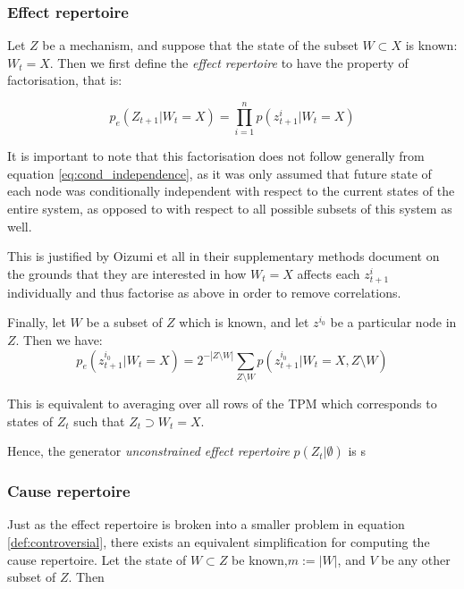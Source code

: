 \subsubsection{Effect repertoire}

Let $Z$ be a mechanism, and suppose that the state of the subset $W \subset X$ is known: $W_t = X$. Then we first define the \textit{effect repertoire} to have the property of factorisation, that is:

\begin{equation}
\label{def:controversial}
p_e(Z_{t+1}|W_t = X) = \prod \limits_{i= 1}^n p(z^i_{t+1}|W_t = X)
\end{equation}

It is important to note that this factorisation does not follow generally from equation \ref{eq:cond_independence}, as it was only assumed that future state of each node was conditionally independent with respect to the current states of the entire system, as opposed to with respect to all possible subsets of this system as well.

This is justified by Oizumi et all \cite{oizumi2014phenomenology} in their supplementary methods document on the grounds that they are interested in how $W_t=X$ affects each $z^i_{t+1}$ individually and thus factorise as above in order to remove correlations.


Finally, let $W$ be a subset of $Z$ which is known, and let $z^{i_0}$ be a particular node in $Z$. Then we have:
\begin{equation}
\label{def:effect_repertoire}
p_e(z_{t+1}^{i_0}|W_t = X) = 2^{-|Z\setminus W|}\sum \limits_{Z\setminus W} p(z_{t+1}^{i_0}|W_t = X, Z\setminus W)
\end{equation}

This is equivalent to averaging over all rows of the TPM which corresponds to states of $Z_t$ such that $Z_t \supset W_t = X$.

Hence, the generator \textit{unconstrained effect repertoire} $p(Z_t | \emptyset)$ is s

\subsubsection{Cause repertoire}

Just as the effect repertoire is broken into a smaller problem in equation \ref{def:controversial}, there exists an equivalent simplification for computing the cause repertoire. Let the state of $W \subset Z$ be known,$m:=|W|$, and $V$ be any other subset of $Z$. Then 

